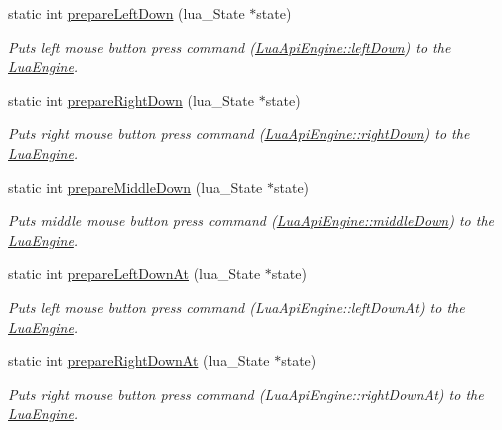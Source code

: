 \begin{DoxyCompactItemize}
static int \hyperlink{class_lua_api_engine_a5e6c9c1b66d19a4f65d6c65d6ae849a2}{prepare\-Left\-Down} (lua\-\_\-\-State $\ast$state)
\begin{DoxyCompactList}\small\item\em Puts left mouse button press command (\hyperlink{class_lua_api_engine_a5942498f999031601960d890b259536b}{Lua\-Api\-Engine\-::left\-Down}) to the \hyperlink{class_lua_engine}{Lua\-Engine}. \end{DoxyCompactList}\item 
static int \hyperlink{class_lua_api_engine_a9975cd495e847300968ce6149846c2f9}{prepare\-Right\-Down} (lua\-\_\-\-State $\ast$state)
\begin{DoxyCompactList}\small\item\em Puts right mouse button press command (\hyperlink{class_lua_api_engine_a14df77fdabe3ddf5dd19c35e70acb2d8}{Lua\-Api\-Engine\-::right\-Down}) to the \hyperlink{class_lua_engine}{Lua\-Engine}. \end{DoxyCompactList}\item 
static int \hyperlink{class_lua_api_engine_a5cd6791cd7b80bb58c0e917f1c35369c}{prepare\-Middle\-Down} (lua\-\_\-\-State $\ast$state)
\begin{DoxyCompactList}\small\item\em Puts middle mouse button press command (\hyperlink{class_lua_api_engine_abea870a5edb171b0bc2345dd1e1e7b95}{Lua\-Api\-Engine\-::middle\-Down}) to the \hyperlink{class_lua_engine}{Lua\-Engine}. \end{DoxyCompactList}\item 
static int \hyperlink{class_lua_api_engine_a15078a5e7a8cedb80f088703b587ec81}{prepare\-Left\-Down\-At} (lua\-\_\-\-State $\ast$state)
\begin{DoxyCompactList}\small\item\em Puts left mouse button press command (Lua\-Api\-Engine\-::left\-Down\-At) to the \hyperlink{class_lua_engine}{Lua\-Engine}. \end{DoxyCompactList}\item 
static int \hyperlink{class_lua_api_engine_a1798695ce32c9d6526a8818535dbc7cf}{prepare\-Right\-Down\-At} (lua\-\_\-\-State $\ast$state)
\begin{DoxyCompactList}\small\item\em Puts right mouse button press command (Lua\-Api\-Engine\-::right\-Down\-At) to the \hyperlink{class_lua_engine}{Lua\-Engine}. \end{DoxyCompactList}\item 

\end{DoxyCompactItemize}
